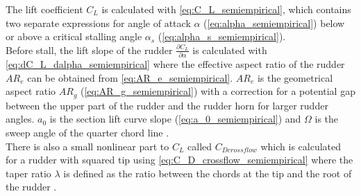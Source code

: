 The lift coefficient $C_L$ is calculated with \autoref{eq:C_L_semiempirical}, which contains two separate expressions for angle of attack $\alpha$ (\autoref{eq:alpha_semiempirical}) below or above a critical stalling angle $\alpha_s$ (\autoref{eq:alpha_s_semiempirical}).
\begin{equation}
    \label{eq:C_L_semiempirical}
    
\end{equation}
%
\begin{equation}
    \label{eq:alpha_s_semiempirical}
    
\end{equation}
%
\begin{equation}
    \label{eq:alpha_semiempirical}
    
\end{equation}
Before stall, the lift slope of the rudder $\frac{\partial C_L}{\partial \alpha}$ is calculated with \autoref{eq:dC_L_dalpha_semiempirical} where the effective aspect ratio of the rudder $AR_e$ can be obtained from \autoref{eq:AR_e_semiempirical}. $AR_e$ is the geometrical aspect ratio $AR_g$ (\autoref{eq:AR_g_semiempirical}) with a correction for a potential gap between the upper part of the rudder and the rudder horn for larger rudder angles.
$a_0$ is the section lift curve slope (\autoref{eq:a_0_semiempirical}) and $\Omega$ is the sweep angle of the quarter chord line \citep{lewis_principles_1989}.
\begin{equation}
    \label{eq:dC_L_dalpha_semiempirical}
    
\end{equation}
%
\begin{equation}
    \label{eq:AR_e_semiempirical}
    
\end{equation}
%
\begin{equation}
    \label{eq:AR_g_semiempirical}
    
\end{equation}
%
\begin{equation}
    \label{eq:a_0_semiempirical}
    
\end{equation}
There is also a small nonlinear part to $C_L$ called $C_{Dcrossflow}$ which is calculated for a rudder with squared tip using \autoref{eq:C_D_crossflow_semiempirical} where the taper ratio $\lambda$ is defined as the ratio between the chords at the tip and the root of the rudder \citep{hughes_tempest_2011}. 
\begin{equation}
    \label{eq:C_D_crossflow_semiempirical}
    
\end{equation}
%
\begin{equation}
    \label{eq:lambda__semiempirical}
    
\end{equation}

